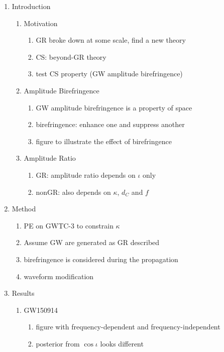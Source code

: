 \documentclass[twocolumn]{aastex631}
\begin{document}
\begin{enumerate}
    \item Introduction
    \begin{enumerate}
        \item Motivation
        \begin{enumerate}
            \item GR broke down at some scale, find a new theory
            \item CS: beyond-GR theory
            \item test CS property (GW amplitude birefringence)
        \end{enumerate}
        \item Amplitude Birefringence
        \begin{enumerate}
            \item GW amplitude birefringence is a property of space
            \item birefringence: enhance one and suppress another
            \item figure to illustrate the effect of birefringence
        \end{enumerate}
        \item Amplitude Ratio
        \begin{enumerate}
            \item GR: amplitude ratio depends on $\iota$ only
            \item nonGR: also depends on $\kappa$, $d_C$ and $f$
        \end{enumerate}
    \end{enumerate}
    \item Method
    \begin{enumerate}
        \item PE on GWTC-3 to constrain $\kappa$
        \item Assume GW are generated as GR described
        \item birefringence is considered during the propagation
        \item waveform modification
    \end{enumerate}
    \item Results
    \begin{enumerate}
        \item GW150914
        \begin{enumerate}
            \item figure with frequency-dependent and frequency-independent
            \item posterior from $\cos\iota$ looks different

\end{enumerate}
\end{enumerate}
\end{enumerate}
\end{document}
